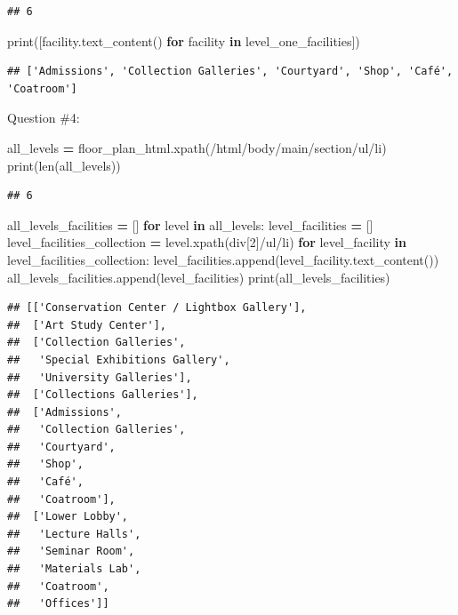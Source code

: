 \documentclass[
]{book}
\newenvironment{Shaded}{\begin{snugshade}}{\end{snugshade}}
\newcommand{\BuiltInTok}[1]{#1}
\newcommand{\ControlFlowTok}[1]{\textcolor[rgb]{0.13,0.29,0.53}{\textbf{#1}}}
\newcommand{\KeywordTok}[1]{\textcolor[rgb]{0.13,0.29,0.53}{\textbf{#1}}}
\newcommand{\NormalTok}[1]{#1}
\newcommand{\OperatorTok}[1]{\textcolor[rgb]{0.81,0.36,0.00}{\textbf{#1}}}
\newcommand{\StringTok}[1]{\textcolor[rgb]{0.31,0.60,0.02}{#1}}
\begin{document}
\begin{verbatim}
## 6
\end{verbatim}

\begin{Shaded}
\begin{Highlighting}[]
\BuiltInTok{print}\NormalTok{([facility.text\_content() }\ControlFlowTok{for}\NormalTok{ facility }\KeywordTok{in}\NormalTok{ level\_one\_facilities])}
\end{Highlighting}
\end{Shaded}

\begin{verbatim}
## ['Admissions', 'Collection Galleries', 'Courtyard', 'Shop', 'Café', 'Coatroom']
\end{verbatim}

Question \#4:

\begin{Shaded}
\begin{Highlighting}[]
\NormalTok{all\_levels }\OperatorTok{=}\NormalTok{ floor\_plan\_html.xpath(}\StringTok{\textquotesingle{}/html/body/main/section/ul/li\textquotesingle{}}\NormalTok{)}
\BuiltInTok{print}\NormalTok{(}\BuiltInTok{len}\NormalTok{(all\_levels))}
\end{Highlighting}
\end{Shaded}

\begin{verbatim}
## 6
\end{verbatim}

\begin{Shaded}
\begin{Highlighting}[]
\NormalTok{all\_levels\_facilities }\OperatorTok{=}\NormalTok{ []}
\ControlFlowTok{for}\NormalTok{ level }\KeywordTok{in}\NormalTok{ all\_levels:}
\NormalTok{    level\_facilities }\OperatorTok{=}\NormalTok{ []}
\NormalTok{    level\_facilities\_collection }\OperatorTok{=}\NormalTok{ level.xpath(}\StringTok{\textquotesingle{}div[2]/ul/li\textquotesingle{}}\NormalTok{)}
    \ControlFlowTok{for}\NormalTok{ level\_facility }\KeywordTok{in}\NormalTok{ level\_facilities\_collection:}
\NormalTok{        level\_facilities.append(level\_facility.text\_content())}
\NormalTok{    all\_levels\_facilities.append(level\_facilities)}
\BuiltInTok{print}\NormalTok{(all\_levels\_facilities)}
\end{Highlighting}
\end{Shaded}

\begin{verbatim}
## [['Conservation Center / Lightbox Gallery'],
##  ['Art Study Center'],
##  ['Collection Galleries',
##   'Special Exhibitions Gallery',
##   'University Galleries'],
##  ['Collections Galleries'],
##  ['Admissions',
##   'Collection Galleries',
##   'Courtyard',
##   'Shop',
##   'Café',
##   'Coatroom'],
##  ['Lower Lobby',
##   'Lecture Halls',
##   'Seminar Room',
##   'Materials Lab',
##   'Coatroom',
##   'Offices']]
\end{verbatim}
\end{document}
